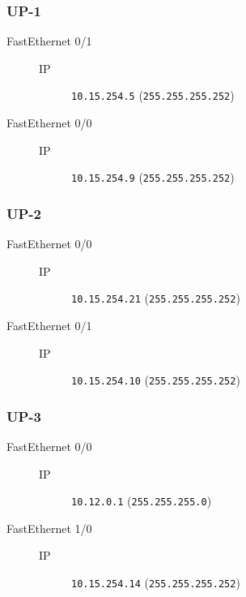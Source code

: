 \subsubsection{UP-1}

	\begin{description}
		\item[FastEthernet 0/1] 
		\begin{description}
			\item[IP] \texttt{10.15.254.5} (\texttt{255.255.255.252})
		\end{description}

		\item[FastEthernet 0/0] 
		\begin{description}
			\item[IP] \texttt{10.15.254.9} (\texttt{255.255.255.252})
		\end{description}

	\end{description}
\subsubsection{UP-2}

	\begin{description}
		\item[FastEthernet 0/0] 
		\begin{description}
			\item[IP] \texttt{10.15.254.21} (\texttt{255.255.255.252})
		\end{description}

		\item[FastEthernet 0/1] 
		\begin{description}
			\item[IP] \texttt{10.15.254.10} (\texttt{255.255.255.252})
		\end{description}

	\end{description}
\subsubsection{UP-3}

	\begin{description}
		\item[FastEthernet 0/0] 
		\begin{description}
			\item[IP] \texttt{10.12.0.1} (\texttt{255.255.255.0})
		\end{description}

		\item[FastEthernet 1/0] 
		\begin{description}
			\item[IP] \texttt{10.15.254.14} (\texttt{255.255.255.252})
		\end{description}

	\end{description}
